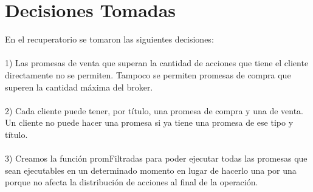 \documentclass[10pt, a4paper]{article}
\begin{document}
\section{Decisiones Tomadas}
En el recuperatorio se tomaron las siguientes decisiones:\\
\\
1) Las promesas de venta que superan la cantidad de acciones que tiene el cliente directamente no se permiten. Tampoco se permiten promesas de compra que superen la cantidad m\'{a}xima del broker.\\
\\
2) Cada cliente puede tener, por t\'{i}tulo, una promesa de compra y una de venta. Un cliente no puede hacer una promesa si ya tiene una promesa de ese tipo y t\'{i}tulo.\\
\\
3) Creamos la funci\'{o}n promFiltradas para poder ejecutar todas las promesas que sean ejecutables en un determinado momento en lugar de hacerlo una por una porque no afecta la distribuci\'{o}n de acciones al final de la operaci\'{o}n. \\
\end{document}
